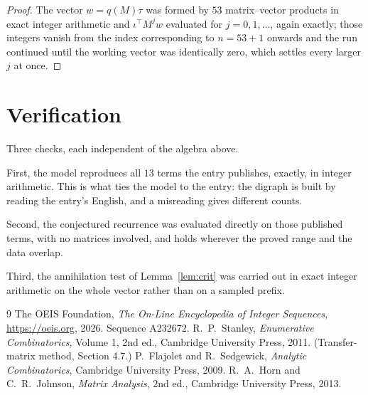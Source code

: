\documentclass[11pt,a4paper]{article}
\theoremstyle{plain}
\theoremstyle{definition}
\begin{document}
\begin{proof}
The vector $w=q(M)\tau$ was formed by $53$ matrix--vector products in exact integer
arithmetic and $\iota^{\!\top}M^{j}w$ evaluated for $j=0,1,\dots$, again exactly; those
integers vanish from the index corresponding to $n=53+1$ onwards and the run continued
until the working vector was identically zero, which settles every larger $j$ at once.
\end{proof}

\section{Verification}

Three checks, each independent of the algebra above.

First, the model reproduces all $13$ terms the entry publishes, exactly, in integer
arithmetic. This is what ties the model to the entry: the digraph is built by reading the
entry's English, and a misreading gives different counts.

Second, the conjectured recurrence was evaluated directly on those published terms, with no
matrices involved, and holds wherever the proved range and the data overlap.

Third, the annihilation test of Lemma~\ref{lem:crit} was carried out in exact integer
arithmetic on the whole vector rather than on a sampled prefix.

\begin{thebibliography}{9}
 The OEIS Foundation, \emph{The On-Line Encyclopedia of Integer
Sequences}, \url{https://oeis.org}, 2026. Sequence A232672.
 R.~P.~Stanley, \emph{Enumerative Combinatorics}, Volume 1, 2nd ed.,
Cambridge University Press, 2011. (Transfer-matrix method, Section 4.7.)
 P.~Flajolet and R.~Sedgewick, \emph{Analytic Combinatorics}, Cambridge
University Press, 2009.
 R.~A.~Horn and C.~R.~Johnson, \emph{Matrix Analysis}, 2nd ed., Cambridge
University Press, 2013.
\end{thebibliography}
\end{document}
